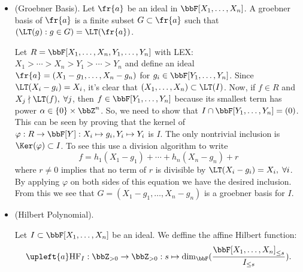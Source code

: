 \begin{itemize}
    \item(Groebner Basis). Let $\fr{a}$ be an ideal in $\bbF[X_1,\dots, X_n]$. A groebner basis of $\fr{a}$ 
    is a finite subset $G\subset\fr{a}$ such that $(\LT(g):g\in G) = \LT(\fr{a})$.\par 
    
    \begin{example}
        Let $R=\bbF[X_1,\dots, X_n, Y_1,\dots, Y_n]$ with LEX: $X_1>\cdots>X_n>Y_1>\cdots>Y_n$ and define an ideal 
    $\fr{a} = (X_1 - g_1,\dots, X_n - g_n)$ for $g_i\in\bbF[Y_1,\dots, Y_n]$. Since 
    $\LT(X_i - g_i)=X_i$, it's clear that $(X_1,\dots, X_n)\subset \LT(I)$. Now, if $f\in R$ and 
    $X_j\nmid \LT(f),\;\forall j$, then $f\in \bbF[Y_1,\dots, Y_n]$ because its smallest term has 
    power $\alpha \in \{0\}\times\bbZ^n$. So, we need to show that $I\cap \bbF[Y_1,\dots, Y_n] = (0)$. This can be seen 
    by proving that the kernel of $\varphi: R\to \bbF[Y]:X_i\mapsto g_i, Y_i\mapsto Y_i$ is $I$. The only nontrivial inclusion 
    is $\Ker(\varphi)\subset I$. To see this use a division algorithm to write 
    \begin{equation}
        f = h_1(X_1-g_1)+\cdots + h_n(X_n-g_n) + r
    \end{equation}
     where $r\neq0$ implies that no term of $r$ is divisible by $\LT(X_i - g_i) = X_i,\;\forall i$. By applying 
     $\varphi$ on both sides of this equation we have the desired inclusion. From this we see that 
     $G = (X_1-g_1,\dots, X_n-g_n)$ is a groebner basis for $I$.
    \end{example}
    \item(Hilbert Polynomial). 
    \begin{definition}
        Let $I\subset \bbF[X_1,\dots, X_n]$ be an ideal. We deffine the affine Hilbert function:
        \begin{equation}
            \upleft{a}\text{HF}_I:\bbZ_{>0}\to\bbZ_{>0}:s\mapsto \dim_{\bbF}(\frac{\bbF[X_1,\dots,X_n]_{\leq s}}{I_{\leq s}}).
        \end{equation}
    \end{definition}


\end{itemize}
